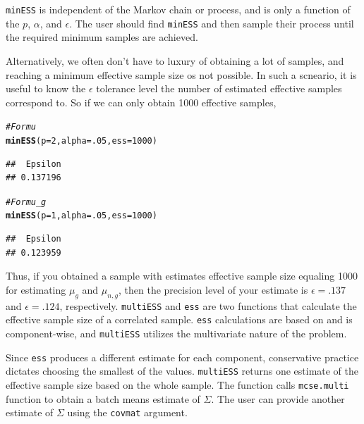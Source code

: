 \documentclass[11pt]{article}\usepackage[]{graphicx}\usepackage[]{color}
\makeatletter
\newcommand{\hlnum}[1]{\textcolor[rgb]{0.686,0.059,0.569}{#1}}%
\newcommand{\hlcom}[1]{\textcolor[rgb]{0.678,0.584,0.686}{\textit{#1}}}%
\newcommand{\hlstd}[1]{\textcolor[rgb]{0.345,0.345,0.345}{#1}}%
\newcommand{\hlkwc}[1]{\textcolor[rgb]{0.333,0.667,0.333}{#1}}%
\newcommand{\hlkwd}[1]{\textcolor[rgb]{0.737,0.353,0.396}{\textbf{#1}}}%
\newenvironment{kframe}{%
 \def\at@end@of@kframe{}%
 \ifinner\ifhmode%
  \def\at@end@of@kframe{\end{minipage}}%
  \begin{minipage}{\columnwidth}%
 \fi\fi%
 \def\FrameCommand##1{\hskip\@totalleftmargin \hskip-\fboxsep
 \colorbox{shadecolor}{##1}\hskip-\fboxsep
     \hskip-\linewidth \hskip-\@totalleftmargin \hskip\columnwidth}%
 \MakeFramed {\advance\hsize-\width
   \@totalleftmargin\z@ \linewidth\hsize
   \@setminipage}}%
 {\par\unskip\endMakeFramed%
 \at@end@of@kframe}
\newenvironment{knitrout}{}{} %
\makeatother
\begin{document}
\texttt{minESS} is independent of the Markov chain or process, and is only a function of the  $p$, $\alpha$, and $\epsilon$. The user should find \texttt{minESS} and then sample their process until the required minimum samples are achieved. 

Alternatively, we often don't have to luxury of obtaining a lot of samples, and reaching a minimum effective sample size os not possible. In such a scneario, it is useful to know the $\epsilon$ tolerance level the number of estimated effective samples correspond to. So if we can only obtain 1000 effective samples,
\begin{knitrout}
\color{fgcolor}\begin{kframe}
\begin{alltt}
\hlcom{# For mu}
\hlkwd{minESS}\hlstd{(}\hlkwc{p} \hlstd{=} \hlnum{2}\hlstd{,} \hlkwc{alpha} \hlstd{=} \hlnum{.05}\hlstd{,} \hlkwc{ess} \hlstd{=} \hlnum{1000}\hlstd{)}
\end{alltt}
\begin{verbatim}
##  Epsilon 
## 0.137196
\end{verbatim}
\begin{alltt}
\hlcom{#For mu_g}
\hlkwd{minESS}\hlstd{(}\hlkwc{p} \hlstd{=} \hlnum{1}\hlstd{,} \hlkwc{alpha} \hlstd{=} \hlnum{.05}\hlstd{,} \hlkwc{ess} \hlstd{=} \hlnum{1000}\hlstd{)}
\end{alltt}
\begin{verbatim}
##  Epsilon 
## 0.123959
\end{verbatim}
\end{kframe}
\end{knitrout}

Thus, if you obtained a sample with estimates effective sample size equaling 1000 for estimating $\mu_g$ and $\mu_{n,g}$, then the precision level of your estimate is $\epsilon = .137$ and $\epsilon = .124$, respectively.
\texttt{multiESS} and \texttt{ess} are two functions that calculate the effective sample size of a correlated sample. \texttt{ess} calculations are based on \cite{gong2015practical} and is component-wise, and \texttt{multiESS} utilizes the multivariate nature of the problem.


Since \texttt{ess} produces a different estimate for each component, conservative practice dictates choosing the smallest of the values. \texttt{multiESS} returns one estimate of the effective sample size based on the whole sample. The function calls \texttt{mcse.multi} function to obtain a batch means estimate of $\Sigma$. The user can provide another estimate of $\Sigma$ using the \texttt{covmat} argument.
\end{document}
